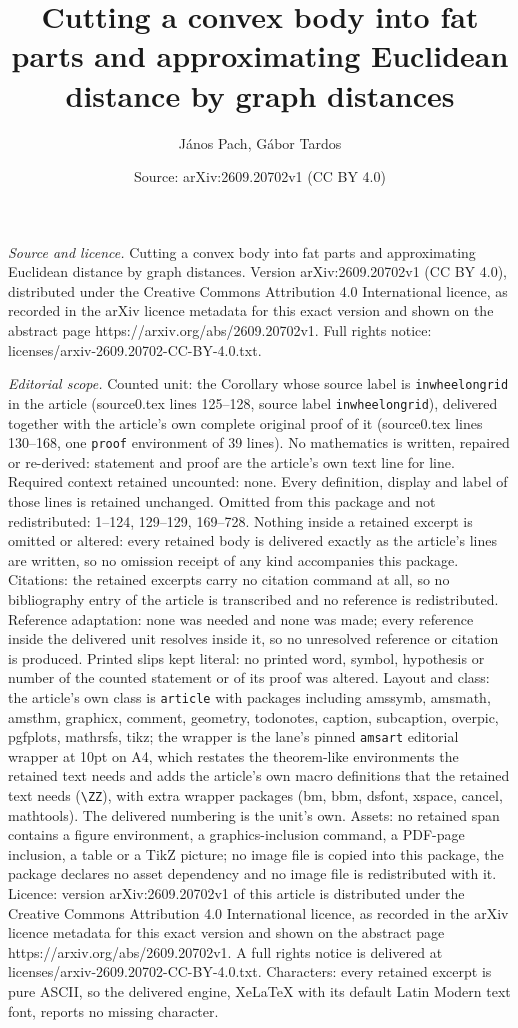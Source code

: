 \documentclass[10pt,a4paper]{amsart}
\title[Cutting a convex body into fat parts and approximating Eucli]{Cutting a convex body into fat parts and approximating Euclidean distance by graph distances}
\author{J\'anos Pach, G\'abor Tardos}
\date{Source: arXiv:2609.20702v1 (CC BY 4.0)}
\begin{document}
\maketitle

\noindent\emph{Source and licence.} Cutting a convex body into fat parts and approximating Euclidean distance by graph distances. Version arXiv:2609.20702v1 (CC BY 4.0), distributed under the Creative Commons Attribution 4.0 International licence, as recorded in the arXiv licence metadata for this exact version and shown on the abstract page https://arxiv.org/abs/2609.20702v1. Full rights notice: licenses/arxiv-2609.20702-CC-BY-4.0.txt.\par\smallskip

\noindent\textit{Editorial scope.} Counted unit: the Corollary whose source label is \texttt{inwheelongrid} in the article (source0.tex lines 125--128, source label \texttt{inwheelongrid}), delivered together with the article's own complete original proof of it (source0.tex lines 130--168, one \texttt{proof} environment of 39 lines). No mathematics is written, repaired or re-derived: statement and proof are the article's own text line for line. Required context retained uncounted: none. Every definition, display and label of those lines is retained unchanged. Omitted from this package and not redistributed: 1--124, 129--129, 169--728. Nothing inside a retained excerpt is omitted or altered: every retained body is delivered exactly as the article's lines are written, so no omission receipt of any kind accompanies this package. Citations: the retained excerpts carry no citation command at all, so no bibliography entry of the article is transcribed and no reference is redistributed. Reference adaptation: none was needed and none was made; every reference inside the delivered unit resolves inside it, so no unresolved reference or citation is produced. Printed slips kept literal: no printed word, symbol, hypothesis or number of the counted statement or of its proof was altered. Layout and class: the article's own class is \texttt{article} with packages including amssymb, amsmath, amsthm, graphicx, comment, geometry, todonotes, caption, subcaption, overpic, pgfplots, mathrsfs, tikz; the wrapper is the lane's pinned \texttt{amsart} editorial wrapper at 10pt on A4, which restates the theorem-like environments the retained text needs and adds the article's own macro definitions that the retained text needs (\texttt{\textbackslash ZZ}), with extra wrapper packages (bm, bbm, dsfont, xspace, cancel, mathtools). The delivered numbering is the unit's own. Assets: no retained span contains a figure environment, a graphics-inclusion command, a PDF-page inclusion, a table or a TikZ picture; no image file is copied into this package, the package declares no asset dependency and no image file is redistributed with it. Licence: version arXiv:2609.20702v1 of this article is distributed under the Creative Commons Attribution 4.0 International licence, as recorded in the arXiv licence metadata for this exact version and shown on the abstract page https://arxiv.org/abs/2609.20702v1. A full rights notice is delivered at licenses/arxiv-2609.20702-CC-BY-4.0.txt. Characters: every retained excerpt is pure ASCII, so the delivered engine, XeLaTeX with its default Latin Modern text font, reports no missing character.
\end{document}
